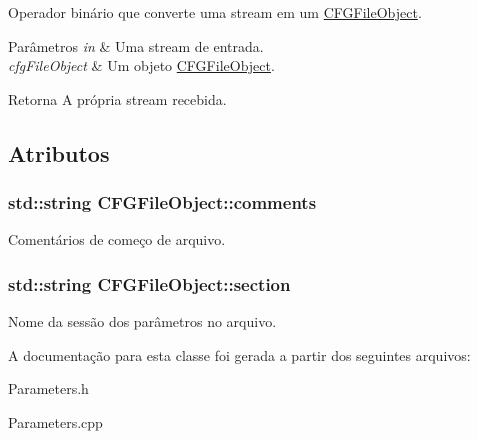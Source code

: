 Operador binário que converte uma stream em um \hyperlink{class_c_f_g_file_object}{C\-F\-G\-File\-Object}. 
\begin{DoxyParams}{Parâmetros}
{\em in} & Uma stream de entrada. \\
\hline
{\em cfg\-File\-Object} & Um objeto \hyperlink{class_c_f_g_file_object}{C\-F\-G\-File\-Object}. \\
\hline
\end{DoxyParams}
\begin{DoxyReturn}{Retorna}
A própria stream recebida. 
\end{DoxyReturn}


\subsection{Atributos}
\hypertarget{class_c_f_g_file_object_ad5bd5931f86c7843eeaca0c7a240e647}{
\subsubsection[{comments}]{\setlength{\rightskip}{0pt plus 5cm}std\-::string C\-F\-G\-File\-Object\-::comments\hspace{0.3cm}{\ttfamily [protected]}}}\label{class_c_f_g_file_object_ad5bd5931f86c7843eeaca0c7a240e647}
Comentários de começo de arquivo. \hypertarget{class_c_f_g_file_object_a7d62f5a9b853173c9d36e315c3de21b3}{
\subsubsection[{section}]{\setlength{\rightskip}{0pt plus 5cm}std\-::string C\-F\-G\-File\-Object\-::section\hspace{0.3cm}{\ttfamily [protected]}}}\label{class_c_f_g_file_object_a7d62f5a9b853173c9d36e315c3de21b3}
Nome da sessão dos parâmetros no arquivo. 

A documentação para esta classe foi gerada a partir dos seguintes arquivos\-:\begin{DoxyCompactItemize}
\item 
Parameters.\-h\item 
Parameters.\-cpp\end{DoxyCompactItemize}
